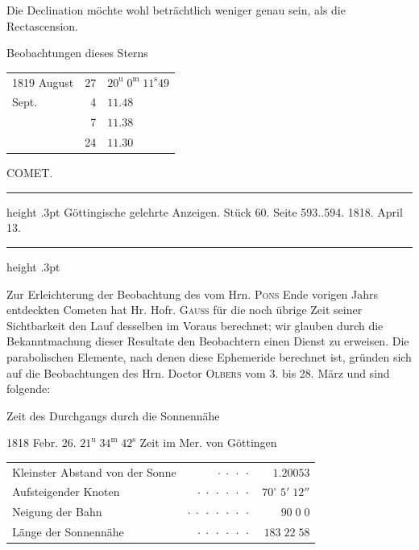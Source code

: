 \par\indent Die Declination möchte wohl beträchtlich weniger genau sein, als die
Rectascension.

\par\indent [Handschrift:] Beobachtungen dieses Sterns
\begin{center}\fontsize{10}{12}\selectfont\begin{tabular}{lrl}
1819 August & 27 & $20^{\mathrm u}\;0^{\mathrm m}\;11^{\mathrm s}49$\\
Sept. & 4 & $11.48$\\
& 7 & $11.38$\\
& 24 & $11.30$\\
\end{tabular}\end{center}

\par\bigskip
{}
\hypertarget{native-408-part-lower}{}\label{native-408-part-lower}
\begin{center}\large COMET.\end{center}
\begin{center}
\parbox{.80\linewidth}{%
\centering\small
\hrule height .3pt\relax\vspace{2.5pt}
Göttingische gelehrte Anzeigen. Stück 60. Seite 593..594. 1818. April 13.\par
\vspace{2.5pt}\hrule height .3pt\relax
}
\end{center}
\par\indent Zur Erleichterung der Beobachtung des vom Hrn. \textsc{Pons} Ende vorigen Jahrs
entdeckten Cometen hat Hr. Hofr. \textsc{Gauss} für die noch übrige Zeit
seiner Sichtbarkeit den Lauf desselben im Voraus berechnet; wir glauben durch
die Bekanntmachung dieser Resultate den Beobachtern einen Dienst zu
erweisen. Die parabolischen Elemente, nach denen diese Ephemeride berechnet
ist, gründen sich auf die Beobachtungen des Hrn. Doctor \textsc{Olbers} vom
3. bis 28. März und sind folgende:

\begin{center}\fontsize{10}{12}\selectfont
Zeit des Durchgangs durch die Sonnennähe
\par 1818 Febr. 26. $21^{\mathrm u}\;34^{\mathrm m}\;42^{\mathrm s}$ Zeit im Mer. von Göttingen
\par\smallskip\begin{tabular}{lrr}
Kleinster Abstand von der Sonne & $\cdot\;\cdot\;\cdot\;\cdot$ & $1.20053$\\
Aufsteigender Knoten & $\cdot\;\cdot\;\cdot\;\cdot\;\cdot\;\cdot$ & $70^\circ\;5'\;12''$\\
Neigung der Bahn & $\cdot\;\cdot\;\cdot\;\cdot\;\cdot\;\cdot\;\cdot$ & $90\;0\;0$\\
Länge der Sonnennähe & $\cdot\;\cdot\;\cdot\;\cdot\;\cdot\;\cdot$ & $183\;22\;58$\\
\end{tabular}\end{center}

